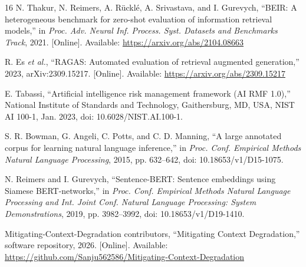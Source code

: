 \documentclass[conference]{IEEEtran}
\begin{document}
\begin{thebibliography}{16}
N. Thakur, N. Reimers, A. R\"uckl\'e, A. Srivastava, and I. Gurevych,
``BEIR: A heterogeneous benchmark for zero-shot evaluation of information
retrieval models,'' in \emph{Proc. Adv. Neural Inf. Process. Syst. Datasets
and Benchmarks Track}, 2021. [Online]. Available:
\url{https://arxiv.org/abs/2104.08663}

R. Es \emph{et al.}, ``RAGAS: Automated evaluation of retrieval augmented
generation,'' 2023, arXiv:2309.15217. [Online]. Available:
\url{https://arxiv.org/abs/2309.15217}

E. Tabassi, ``Artificial intelligence risk management framework (AI RMF
1.0),'' National Institute of Standards and Technology, Gaithersburg, MD,
USA, NIST AI 100-1, Jan. 2023, doi: 10.6028/NIST.AI.100-1.

S. R. Bowman, G. Angeli, C. Potts, and C. D. Manning, ``A large annotated
corpus for learning natural language inference,'' in \emph{Proc. Conf.
Empirical Methods Natural Language Processing}, 2015, pp. 632--642,
doi: 10.18653/v1/D15-1075.

N. Reimers and I. Gurevych, ``Sentence-BERT: Sentence embeddings using
Siamese BERT-networks,'' in \emph{Proc. Conf. Empirical Methods Natural
Language Processing and Int. Joint Conf. Natural Language Processing:
System Demonstrations}, 2019, pp. 3982--3992,
doi: 10.18653/v1/D19-1410.

Mitigating-Context-Degradation contributors, ``Mitigating Context
Degradation,'' software
repository, 2026. [Online]. Available:
\url{https://github.com/Sanju562586/Mitigating-Context-Degradation}

\end{thebibliography}
\end{document}

